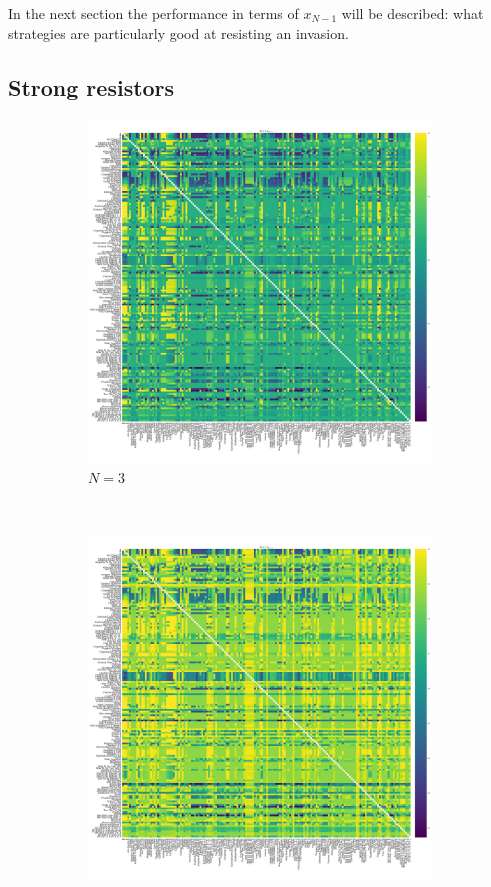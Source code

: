 \documentclass{article}
\begin{document}
In the next section the performance in terms of \(x_{N-1}\) will be described:
what strategies are particularly good at resisting an invasion.

\subsection{Strong resistors}\label{sec:strong_resistors}

\begin{figure}[!hbtp]
    \centering
    \begin{subfigure}[t]{.3\textwidth}
        \centering
        \includegraphics[width=.8\textwidth]{./img/fixation_heatmap_3_resist.pdf}
        \caption{\(N=3\)}
    \end{subfigure}%
    ~
    \begin{subfigure}[t]{.3\textwidth}
        \centering
        \includegraphics[width=.8\textwidth]{./img/fixation_heatmap_7_resist.pdf}

\end{subfigure}
\end{figure}
\end{document}
